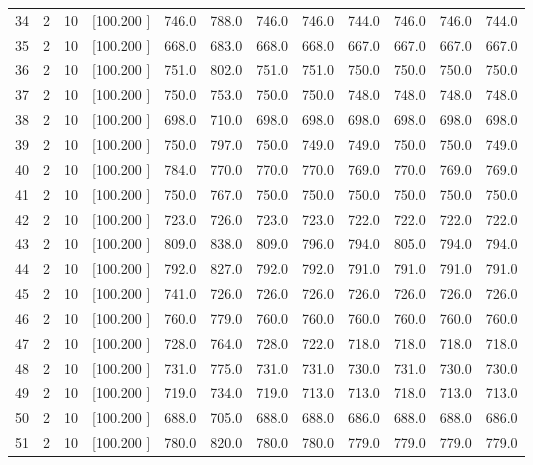 \documentclass[12pt,a4paper]{article}
\begin{document}
\begin{center}
{\begin{tabular}{r r r r r r r r r r r r}
  34&  2& 10&[100.200   ]&   746.0&   788.0&   746.0&   746.0&   744.0&   746.0&   746.0&   744.0\\[-0.02in]
  35&  2& 10&[100.200   ]&   668.0&   683.0&   668.0&   668.0&   667.0&   667.0&   667.0&   667.0\\[-0.02in]
  36&  2& 10&[100.200   ]&   751.0&   802.0&   751.0&   751.0&   750.0&   750.0&   750.0&   750.0\\[-0.02in]
  37&  2& 10&[100.200   ]&   750.0&   753.0&   750.0&   750.0&   748.0&   748.0&   748.0&   748.0\\[-0.02in]
  38&  2& 10&[100.200   ]&   698.0&   710.0&   698.0&   698.0&   698.0&   698.0&   698.0&   698.0\\[-0.02in]
  39&  2& 10&[100.200   ]&   750.0&   797.0&   750.0&   749.0&   749.0&   750.0&   750.0&   749.0\\[-0.02in]
  40&  2& 10&[100.200   ]&   784.0&   770.0&   770.0&   770.0&   769.0&   770.0&   769.0&   769.0\\[-0.02in]
  41&  2& 10&[100.200   ]&   750.0&   767.0&   750.0&   750.0&   750.0&   750.0&   750.0&   750.0\\[-0.02in]
  42&  2& 10&[100.200   ]&   723.0&   726.0&   723.0&   723.0&   722.0&   722.0&   722.0&   722.0\\[-0.02in]
  43&  2& 10&[100.200   ]&   809.0&   838.0&   809.0&   796.0&   794.0&   805.0&   794.0&   794.0\\[-0.02in]
  44&  2& 10&[100.200   ]&   792.0&   827.0&   792.0&   792.0&   791.0&   791.0&   791.0&   791.0\\[-0.02in]
  45&  2& 10&[100.200   ]&   741.0&   726.0&   726.0&   726.0&   726.0&   726.0&   726.0&   726.0\\[-0.02in]
  46&  2& 10&[100.200   ]&   760.0&   779.0&   760.0&   760.0&   760.0&   760.0&   760.0&   760.0\\[-0.02in]
  47&  2& 10&[100.200   ]&   728.0&   764.0&   728.0&   722.0&   718.0&   718.0&   718.0&   718.0\\[-0.02in]
  48&  2& 10&[100.200   ]&   731.0&   775.0&   731.0&   731.0&   730.0&   731.0&   730.0&   730.0\\[-0.02in]
  49&  2& 10&[100.200   ]&   719.0&   734.0&   719.0&   713.0&   713.0&   718.0&   713.0&   713.0\\[-0.02in]
  50&  2& 10&[100.200   ]&   688.0&   705.0&   688.0&   688.0&   686.0&   688.0&   688.0&   686.0\\[-0.02in]
  51&  2& 10&[100.200   ]&   780.0&   820.0&   780.0&   780.0&   779.0&   779.0&   779.0&   779.0\\[-0.02in]

\end{tabular}}
\end{center}
\end{document}
